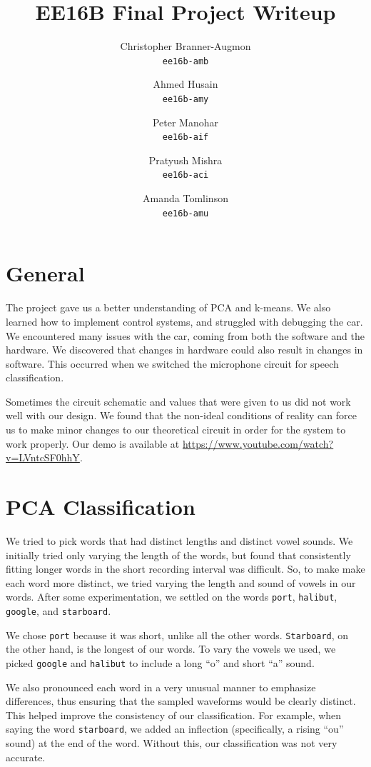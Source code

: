 \documentclass[12pt]{article}
\title{\vspace{-2cm}\textsc{EE16B} Final Project Writeup}
\author{%
        Christopher Branner-Augmon \\
          \texttt{ee16b-amb}
        \and
        Ahmed Husain \\
          \texttt{ee16b-amy}
        \and
        Peter Manohar \\
          \texttt{ee16b-aif}
        \and
        Pratyush Mishra \\
        \texttt{ee16b-aci}
        \and
        Amanda Tomlinson\\
        \texttt{ee16b-amu}
      }
\newcommand{\port}{\texttt{port}}
\newcommand{\google}{\texttt{google}}
\newcommand{\starboard}{\texttt{starboard}}
\newcommand{\halibut}{\texttt{halibut}}
\begin{document}
\maketitle
\section*{General}

The project gave us a better understanding of PCA and k-means. We also learned
how to implement control systems, and struggled with debugging the car.  We
encountered many issues with the car, coming from both the software and the
hardware. We discovered that changes in hardware could also result in changes
in software. This occurred when we switched the microphone circuit for speech
classification.

Sometimes the circuit schematic and values that were given to us did not work
well with our design. We found that the non-ideal conditions of reality can
force us to make minor changes to our theoretical circuit in order for the
system to work properly.  Our demo is available at
\url{https://www.youtube.com/watch?v=LVntcSF0hhY}.

\section*{PCA Classification}

We tried to pick words that had distinct lengths and distinct vowel sounds. We
initially tried only varying the length of the words, but found that
consistently fitting longer words in the short recording interval was
difficult.  So, to make make each word more distinct, we tried varying the
length and sound of vowels in our words. After some experimentation, we settled
on the words {\port}, {\halibut}, {\google}, and {\starboard}.

We chose {\port} because it was short, unlike all the other words.
\texttt{Starboard}, on the other hand, is the longest of our words. To vary the
vowels we used, we picked {\google} and {\halibut} to include a long ``o''
and short ``a'' sound.

We also pronounced each word in a very unusual manner to emphasize differences,
thus ensuring that the sampled waveforms would be clearly distinct.  This
helped improve the consistency of our classification. For example, when saying
the word \texttt{starboard}, we added an inflection (specifically, a rising ``ou''
sound) at the end of the word. Without this, our classification was not very
accurate.
\end{document}
